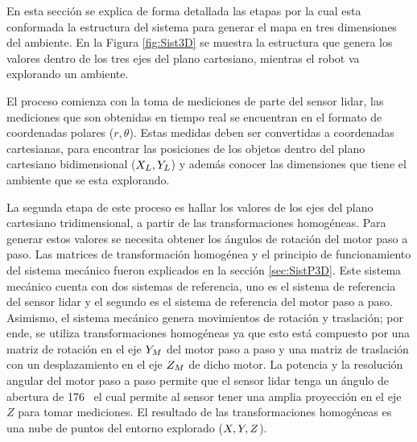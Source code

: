 En esta sección se explica de forma detallada las etapas por la cual esta conformada la estructura
del sistema para generar el mapa en tres dimensiones del ambiente. En la Figura \ref{fig:Sist3D} se 
muestra la estructura que genera los valores dentro de los tres ejes del plano cartesiano, mientras
el robot va explorando un ambiente.

El proceso comienza con la toma de mediciones de parte del sensor lidar, las mediciones que son 
obtenidas en tiempo real se encuentran en el formato de coordenadas polares ($r,\theta$). Estas 
medidas deben ser convertidas a coordenadas cartesianas, para encontrar las posiciones de los
objetos dentro del plano cartesiano bidimensional ($\mathnormal X_{L}, \mathnormal Y_{L}$) y además conocer
las dimensiones que tiene el ambiente que se esta explorando.


La segunda etapa de este proceso es hallar los valores de los ejes del plano cartesiano 
tridimensional, a partir de las transformaciones homogéneas. Para generar estos 
valores se necesita obtener los ángulos de rotación del motor paso a paso. Las matrices
de transformación homogénea y el principio de funcionamiento del sistema mecánico fueron
explicados en la sección \ref{sec:SistP3D}. Este sistema mecánico cuenta con dos sistemas
de referencia, uno es el sistema de referencia del sensor lidar y el segundo es el sistema
de referencia del motor paso a paso. Asimismo, el sistema mecánico genera movimientos de 
rotación y traslación; por ende, se utiliza transformaciones homogéneas ya que esto 
está compuesto por una matriz de rotación en el eje $\mathnormal Y_{M}$ del motor paso a paso y
una matriz de traslación con un desplazamiento en el eje $\mathnormal Z_{M}$ de dicho motor. La potencia
y la resolución angular del motor paso a paso permite que el sensor lidar tenga un ángulo de 
abertura de 176\grad~ el cual permite al sensor tener una amplia proyección en el eje $Z$ para
tomar mediciones. El resultado de las transformaciones homogéneas es una nube de puntos del
entorno explorado ($\mathnormal X, \mathnormal Y, \mathnormal Z$).

